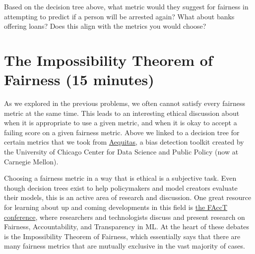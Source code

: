 \documentclass[assignment03_Solutions]{subfiles}
\begin{document}
\begin{exercise}[(40 Minutes)]
\item Based on the decision tree above, what metric would they suggest for fairness in attempting to predict if a person will be arrested again? What about banks offering loans? Does this align with the metrics you would choose?




\ees
\end{exercise}



\section*{The Impossibility Theorem of Fairness (15 minutes)}
As we explored in the previous problems, we often cannot satisfy every fairness metric at the same time. This leads to an interesting ethical discussion about when it is appropriate to use a given metric, and when it is okay to accept a failing score on a given fairness metric. Above we linked to a decision tree for certain metrics that we took from \href{http://www.datasciencepublicpolicy.org/our-work/tools-guides/aequitas/}{Aequitas}, a bias detection toolkit created by the University of Chicago Center for Data Science and Public Policy (now at Carnegie Mellon). 
 
Choosing a fairness metric in a way that is ethical is a subjective task. Even though decision trees exist to help policymakers and model creators evaluate their models, this is an active area of research and discussion. One great resource for learning about up and coming developments in this field is \href{https://facctconference.org/}{the FAccT conference}, where researchers and technologists discuss and present research on Fairness, Accountability, and Transparency in ML. At the heart of these debates is the Impossibility Theorem of Fairness, which essentially says that there are many fairness metrics that are mutually exclusive in the vast majority of cases. 
\end{document}
